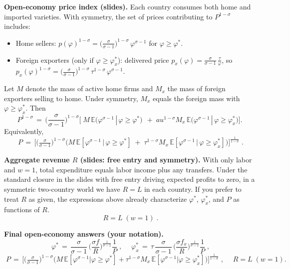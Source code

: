 \begin{solution}
\bigskip
	\textbf{Open-economy price index (slides).}
Each country consumes both home and imported varieties. With symmetry, the set of prices contributing to $P^{1-\sigma}$ includes:
\begin{itemize}
	\item Home sellers: $p(\varphi)^{1-\sigma}=\big(\tfrac{\sigma}{\sigma-1}\big)^{1-\sigma}\,\varphi^{\sigma-1}$ for $\varphi\ge \varphi^*$.
	\item Foreign exporters (only if $\varphi\ge \varphi_x^*$): delivered price $p_x(\varphi)=\tfrac{\sigma}{\sigma-1}\,\tfrac{\tau}{\varphi}$, so $p_x(\varphi)^{1-\sigma}=\big(\tfrac{\sigma}{\sigma-1}\big)^{1-\sigma}\,\tau^{1-\sigma}\,\varphi^{\sigma-1}$.
\end{itemize}
Let $M$ denote the mass of active home firms and $M_x$ the mass of foreign exporters selling to home. Under symmetry, $M_x$ equals the foreign mass with $\varphi\ge \varphi_x^*$. Then
\[
P^{1-\sigma} \,=\, \Big(\frac{\sigma}{\sigma-1}\Big)^{1-\sigma} \bigg[\; M\, \mathbb{E}\big(\varphi^{\sigma-1}\,|\,\varphi\ge \varphi^*\big) \,\; +\; 
	au^{1-\sigma} M_x\, \mathbb{E}\big(\varphi^{\sigma-1}\,|\,\varphi\ge \varphi_x^*\big) \bigg].
\]
Equivalently,
\[
\boxed{\;\displaystyle P \,=\, \Bigg[ \Big(\tfrac{\sigma}{\sigma-1}\Big)^{1-\sigma}\Big( M\, \mathbb{E}[\varphi^{\sigma-1}\,|\,\varphi\ge \varphi^*] 
\; +\; \tau^{1-\sigma} M_x\, \mathbb{E}[\varphi^{\sigma-1}\,|\,\varphi\ge \varphi_x^*]\Big) \Bigg]^{\!\tfrac{1}{1-\sigma}}\; }.
\]

\bigskip
	\textbf{Aggregate revenue $R$ (slides: free entry and symmetry).}
With only labor and $w=1$, total expenditure equals labor income plus any transfers. Under the standard closure in the slides with free entry driving expected profits to zero, in a symmetric two-country world we have $R=L$ in each country. If you prefer to treat $R$ as given, the expressions above already characterize $\varphi^*$, $\varphi_x^*$, and $P$ as functions of $R$.
\[
\boxed{\; R = L \; (w=1)\; }.
\]

\bigskip
	\textbf{Final open-economy answers (your notation).}
\[
\boxed{\;\displaystyle \varphi^* \,=\, \frac{\sigma}{\sigma-1}\,\Big(\frac{\sigma f}{R}\Big)^{\!\tfrac{1}{\sigma-1}} \frac{1}{P}\; },\quad
\boxed{\;\displaystyle \varphi_x^* \,=\, \tau\, \frac{\sigma}{\sigma-1}\,\Big(\frac{\sigma f_x}{R}\Big)^{\!\tfrac{1}{\sigma-1}} \frac{1}{P}\; },
\]
\[
\boxed{\;\displaystyle P \,=\, \Bigg[ \Big(\tfrac{\sigma}{\sigma-1}\Big)^{1-\sigma}\Big( M\, \mathbb{E}[\varphi^{\sigma-1}|\varphi\ge \varphi^*] + \tau^{1-\sigma} M_x\, \mathbb{E}[\varphi^{\sigma-1}|\varphi\ge \varphi_x^*] \Big) \Bigg]^{\!\tfrac{1}{1-\sigma}}\; },\quad
\boxed{\; R = L\; (w=1) }.
\]
\end{solution}
 